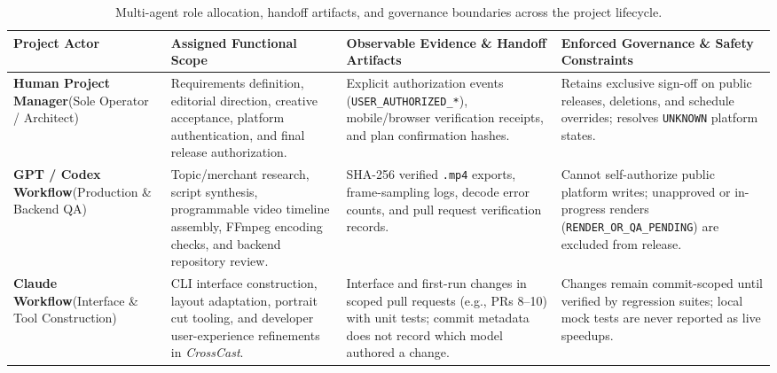 \documentclass[11pt,a4paper]{article}
\theoremstyle{definition}
\begin{document}
\begin{table}[htbp]
\centering
\caption{Multi-agent role allocation, handoff artifacts, and governance boundaries across the project lifecycle.}
\label{tab:2}
\scriptsize
\setlength{\tabcolsep}{3pt}
\begin{tabular}{>{\raggedright\hspace{0pt}\arraybackslash}p{}>{\raggedright\hspace{0pt}\arraybackslash}p{}>{\raggedright\hspace{0pt}\arraybackslash}p{}>{\raggedright\hspace{0pt}\arraybackslash}p{}}
\toprule
\textbf{Project Actor} & \textbf{Assigned Functional Scope} & \textbf{Observable Evidence \& Handoff Artifacts} & \textbf{Enforced Governance \& Safety Constraints} \\
\midrule
\textbf{Human Project Manager}\newline (Sole Operator / Architect) & Requirements definition, editorial direction, creative acceptance, platform authentication, and final release authorization. & Explicit authorization events (\texttt{USER\_\allowbreak{}AUTHORIZED\_\allowbreak{}*}), mobile/browser verification receipts, and plan confirmation hashes. & Retains exclusive sign-off on public releases, deletions, and schedule overrides; resolves \texttt{UNKNOWN} platform states. \\
\textbf{GPT / Codex Workflow}\newline (Production \& Backend QA) & Topic/merchant research, script synthesis, programmable video timeline assembly, FFmpeg encoding checks, and backend repository review. & SHA-256 verified \texttt{.mp4} exports, frame-sampling logs, decode error counts, and pull request verification records. & Cannot self-authorize public platform writes; unapproved or in-progress renders (\texttt{RENDER\_\allowbreak{}OR\_\allowbreak{}QA\_\allowbreak{}PENDING}) are excluded from release. \\
\textbf{Claude Workflow}\newline (Interface \& Tool Construction) & CLI interface construction, layout adaptation, portrait cut tooling, and developer user-experience refinements in \emph{CrossCast}. & Interface and first-run changes in scoped pull requests (e.g., PRs 8--10) with unit tests; commit metadata does not record which model authored a change. & Changes remain commit-scoped until verified by regression suites; local mock tests are never reported as live speedups. \\

\end{tabular}
\end{table}
\end{document}
